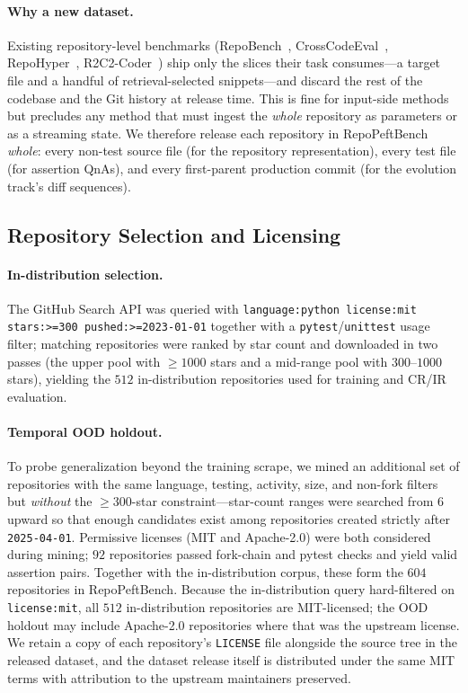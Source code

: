 \documentclass[11pt]{article}
\newcommand{\repopeftbench}{RepoPeftBench\xspace}
\begin{document}
\paragraph{Why a new dataset.}
Existing repository-level benchmarks (RepoBench~\cite{liu2023repobenchbenchmarkingrepositorylevelcode}, CrossCodeEval~\cite{ding2024crosscodeeval}, RepoHyper~\cite{phan2024repohypersearchexpandrefinesemanticgraphs}, R2C2-Coder~\cite{deng2024r2c2coder}) ship only the slices their task consumes---a target file and a handful of retrieval-selected snippets---and discard the rest of the codebase and the Git history at release time.
This is fine for input-side methods but precludes any method that must ingest the \emph{whole} repository as parameters or as a streaming state.
We therefore release each repository in \repopeftbench{} \emph{whole}: every non-test source file (for the repository representation), every test file (for assertion QnAs), and every first-parent production commit (for the evolution track's diff sequences).

\subsection{Repository Selection and Licensing}
\label{app:dataset:selection}

\paragraph{In-distribution selection.}
The GitHub Search API was queried with \texttt{language:python license:mit stars:>=300 pushed:>=2023-01-01} together with a \texttt{pytest}/\texttt{unittest} usage filter; matching repositories were ranked by star count and downloaded in two passes (the upper pool with $\geq 1000$ stars and a mid-range pool with $300$--$1000$ stars), yielding the $512$ in-distribution repositories used for training and CR/IR evaluation.

\paragraph{Temporal OOD holdout.}
To probe generalization beyond the training scrape, we mined an additional set of repositories with the same language, testing, activity, size, and non-fork filters but \emph{without} the $\geq 300$-star constraint---star-count ranges were searched from $6$ upward so that enough candidates exist among repositories created strictly after \texttt{2025-04-01}.
Permissive licenses (MIT and Apache-2.0) were both considered during mining; $92$ repositories passed fork-chain and pytest checks and yield valid assertion pairs.
Together with the in-distribution corpus, these form the $604$ repositories in \repopeftbench{}.
Because the in-distribution query hard-filtered on \texttt{license:mit}, all $512$ in-distribution repositories are MIT-licensed; the OOD holdout may include Apache-2.0 repositories where that was the upstream license.
We retain a copy of each repository's \texttt{LICENSE} file alongside the source tree in the released dataset, and the dataset release itself is distributed under the same MIT terms with attribution to the upstream maintainers preserved.
\end{document}
